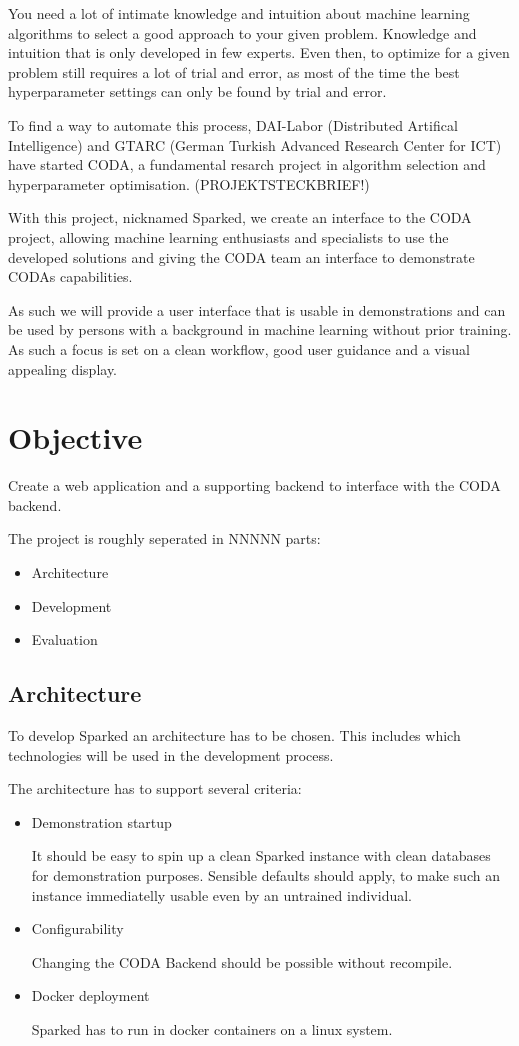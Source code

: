 \documentclass[12pt,a4paper,titlepage,oneside,BCOR1cm]{scrreprt}
\begin{document}
You need a lot of intimate knowledge and intuition about machine learning algorithms to select a good approach to your given problem. Knowledge and intuition that is only developed in few experts. Even then, to optimize for a given problem still requires a lot of trial and error, as most of the time the best hyperparameter settings can only be found by trial and error.

To find a way to automate this process, DAI-Labor (Distributed Artifical Intelligence) and GTARC (German Turkish Advanced Research Center for ICT) have started CODA, a fundamental resarch project in algorithm selection and hyperparameter optimisation. (PROJEKTSTECKBRIEF!)

With this project, nicknamed Sparked, we create an interface to the CODA project, allowing machine learning enthusiasts and specialists to use the developed solutions and giving the CODA team an interface to demonstrate CODAs capabilities.

As such we will provide a user interface that is usable in demonstrations and can be used by persons with a background in machine learning without prior training. As such a focus is set on a clean workflow, good user guidance and a visual appealing display.

\chapter{Objective}
Create a web application and a supporting backend to interface with the CODA backend.

The project is roughly seperated in NNNNN parts:
\begin{itemize}
  \item Architecture
  \item Development
  \item Evaluation
\end{itemize}

\section{Architecture}
To develop Sparked an architecture has to be chosen. This includes which technologies will be used in the development process. 

The architecture has to support several criteria:
\begin{itemize}
  \item Demonstration startup
  
  It should be easy to spin up a clean Sparked instance with clean databases for demonstration purposes. Sensible defaults should apply, to make such an instance immediatelly usable even by an untrained individual.

  \item Configurability

  Changing the CODA Backend should be possible without recompile.

  \item Docker deployment

  Sparked has to run in docker containers on a linux system.

\end{itemize}
\end{document}
